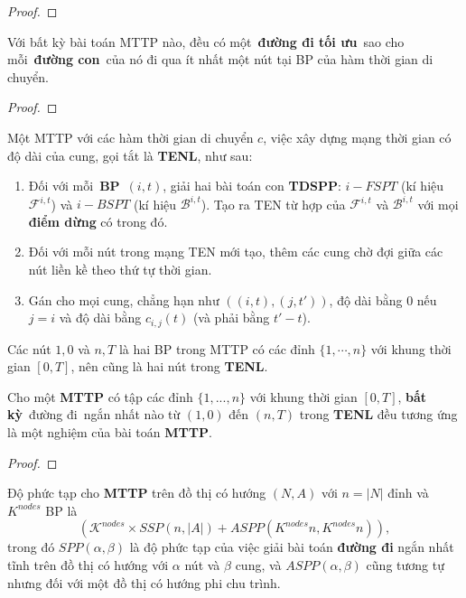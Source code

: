 \documentclass[../main.tex]{subfiles}
\begin{document}
\begin{proof}
\end{proof}

\begin{proposition}
\label{prp:mttp-toi-uu}
Với bất kỳ bài toán MTTP nào, đều có
một~\textbf{đường đi tối ưu}~sao cho mỗi~\textbf{đường con}~của nó đi
qua ít nhất một nút tại BP của hàm thời gian di chuyển.
\end{proposition}

\begin{proof}
\end{proof}

\begin{definition}
Một MTTP với các hàm thời gian di chuyển \(c\),
việc xây dựng mạng thời gian có độ dài của cung, gọi tắt là
\textbf{TENL}, như sau:

\begin{enumerate}
\def\labelenumi{\arabic{enumi}.}
\tightlist
\item
  Đối với mỗi~\textbf{BP}~\((i, t)\), giải hai bài toán con
  \textbf{TDSPP}: \(i-FSPT\) (kí hiệu \(\mathcal F^{i,t}\)) và \(i-BSPT\)
  (kí hiệu \(\mathcal B^{i,t}\)). Tạo ra TEN từ hợp của
  \(\mathcal F^{i,t}\) và \(\mathcal B^{i,t}\) với mọi \textbf{điểm
  dừng} có trong đó.
\item
  Đối với mỗi nút trong mạng TEN mới tạo, thêm các cung chờ đợi giữa các
  nút liền kề theo thứ tự thời gian.
\item
  Gán cho mọi cung, chẳng hạn như \(((i, t), (j, t' ))\), độ dài bằng \(0\) nếu \(j = i\) và độ
  dài bằng \(c_{i,j} (t)\) (và phải bằng \(t' − t\)).
\end{enumerate}

\end{definition}

Các nút \(1, 0\) và \(n, T\) là hai BP trong MTTP có các đỉnh \(\{1,\cdots, n\}\) 
với khung thời gian \([0,T]\), nên cũng là hai nút trong \textbf{TENL}.

\begin{corollary}
\label{col:mttp}
Cho một \textbf{MTTP} có tập các đỉnh
\(\{1,...,n\}\) với khung thời gian \([0,T]\), \textbf{bất kỳ}~đường
đi~ngắn nhất nào từ \((1,0)\) đến \((n,T)\) trong \textbf{TENL} đều
tương ứng là một nghiệm của bài toán \textbf{MTTP}.
\end{corollary}

\begin{proof} \end{proof}

\begin{proposition}
\label{prp:dpt-mttp}
Độ phức tạp cho \textbf{MTTP} trên đồ thị
có hướng \((N,A)\) với \(n = |N|\) đỉnh và \(K^{nodes}\) BP là
\[ (\mathcal{K}^{nodes} ×SSP(n,|A|)+ASPP(K^{nodes}n,K^{nodes}n)), \]
trong đó \(SPP(\alpha,\beta)\) là độ phức tạp của việc giải bài toán
\textbf{đường đi} ngắn nhất tĩnh trên đồ thị có hướng với \(\alpha\) nút
và \(\beta\) cung, và \(ASPP(\alpha,\beta)\) cũng tương tự nhưng đối với
một đồ thị có hướng phi chu trình.
\end{proposition}
\end{document}
